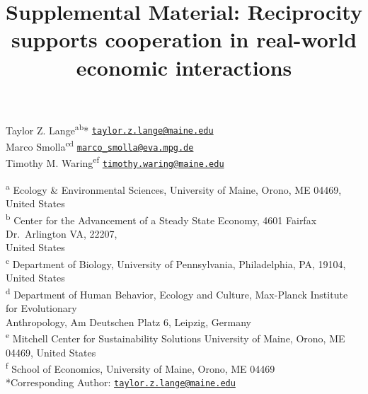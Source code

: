 \documentclass[
]{article}
\title{Supplemental Material: Reciprocity supports cooperation in real-world
economic interactions}
\author{}
\date{\vspace{-2.5em}}
\begin{document}
\maketitle

Taylor Z. Lange\textsuperscript{ab}*
\href{mailto:taylor.z.lange@maine.edu}{\nolinkurl{taylor.z.lange@maine.edu}}\\
Marco Smolla\textsuperscript{cd}
\href{mailto:marco_smolla@eva.mpg.de}{\nolinkurl{marco\_smolla@eva.mpg.de}}\\
Timothy M. Waring\textsuperscript{ef}
\href{mailto:timothy.waring@maine.edu}{\nolinkurl{timothy.waring@maine.edu}}

\textsuperscript{a} Ecology \& Environmental Sciences, University of
Maine, Orono, ME 04469, United States\\
\textsuperscript{b} Center for the Advancement of a Steady State
Economy, 4601 Fairfax Dr.~Arlington VA, 22207,\\
\hspace*{0.333em}\hspace*{0.333em}United States\\
\textsuperscript{c} Department of Biology, University of Pennsylvania,
Philadelphia, PA, 19104, United States\\
\textsuperscript{d} Department of Human Behavior, Ecology and Culture,
Max-Planck Institute for Evolutionary\\
\hspace*{0.333em}\hspace*{0.333em}Anthropology, Am Deutschen Platz 6,
Leipzig, Germany\\
\textsuperscript{e} Mitchell Center for Sustainability Solutions
University of Maine, Orono, ME 04469, United States\\
\textsuperscript{f }School of Economics, University of Maine, Orono, ME
04469\\
*Corresponding Author:
\href{mailto:taylor.z.lange@maine.edu}{\nolinkurl{taylor.z.lange@maine.edu}}
\end{document}
